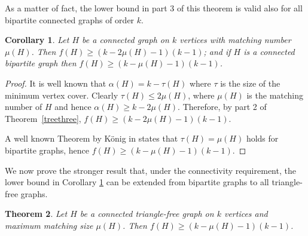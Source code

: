 \documentclass[a4paper,12pt]{article}
\newtheorem{theorem}{Theorem}[section]
\newtheorem{corollary}[theorem]{Corollary}
\begin{document}
As a matter of fact, the lower bound in part 3 of this theorem is valid also for all bipartite connected graphs of order $k$.



\begin{corollary} \label{bipart}
Let $H$  be a connected graph on $k$ vertices with matching number $\mu(H)$. Then $ f(H)  \geq ( k - 2\mu(H) - 1) (k-1)$; and if $H$ is a connected bipartite graph then $f(H)  \geq (k - \mu(H) - 1)(k-1)$.
\end{corollary}
\begin{proof}
It is well known that $\alpha(H) = k - \tau(H)$ where $\tau$ is  the size of the minimum vertex cover. Clearly $\tau(H) \leq 2 \mu(H)$, where $\mu(H)$ is the matching number of $H$ and hence $\alpha(H) \geq k - 2\mu(H)$.  Therefore, by part 2 of Theorem~\ref{treethree}, $f(H) \geq ( k - 2\mu(H) - 1) (k-1)$.

A well known Theorem by K\"onig in \cite{konig1931grafok} states that $\tau(H)=\mu(H)$ holds for bipartite graphs, hence $f(H)  \geq (k - \mu(H) - 1)(k-1)$.
\end{proof}


We now prove the stronger result that, under the connectivity requirement, the lower bound in Corollary \ref{bipart} can be extended from bipartite graphs to all triangle-free graphs.

\begin{theorem} \label{trianglefree}
Let $H$ be a connected triangle-free graph on $k$ vertices and maximum matching size $\mu(H)$. Then $f(H) \ge (k - \mu(H) - 1)(k-1)$.
\end{theorem}
\end{document}
